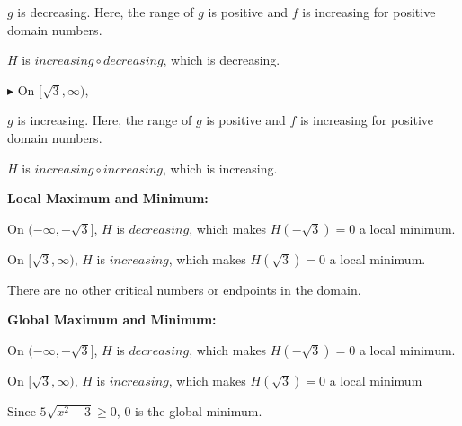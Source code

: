 \documentclass{ximera}
\begin{document}
$g$ is decreasing. Here, the range of $g$ is positive and $f$ is increasing for positive domain numbers. 



\begin{center}
$H$ is $increasing \circ decreasing$, which is decreasing. 
\end{center}





\textbf{\textcolor{blue!55!black}{$\blacktriangleright$}} On $[\sqrt{3}, \infty)$, 


$g$ is increasing. Here, the range of $g$ is positive and $f$ is increasing for positive domain numbers. 


\begin{center}
$H$ is $increasing \circ increasing$, which is increasing. 
\end{center}













\textbf{\textcolor{blue!55!black}{Local Maximum and Minimum:}} 





On $(-\infty, -\sqrt{3} ]$, $H$ is $decreasing$, which makes $H(-\sqrt{3}) = 0$ a local minimum.  


On $[ \sqrt{3}, \infty)$, $H$ is $increasing$, which makes $H(\sqrt{3}) = 0$ a local minimum.  



There are no other critical numbers or endpoints in the domain.









\textbf{\textcolor{blue!55!black}{Global Maximum and Minimum:}} 



On $(-\infty, -\sqrt{3} ]$, $H$ is $decreasing$, which makes $H(-\sqrt{3}) = 0$ a local minimum. 


On $[ \sqrt{3}, \infty)$, $H$ is $increasing$, which makes $H(\sqrt{3}) = 0$ a local minimum  




Since $5 \sqrt{x^2-3} \geq 0$, $0$ is the global minimum. 
\end{document}
